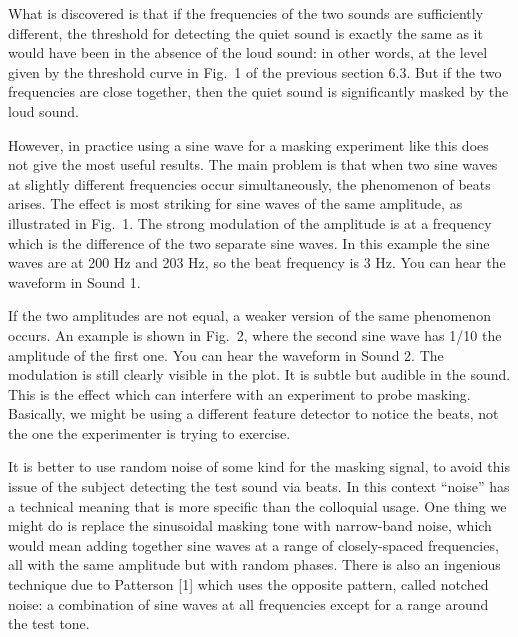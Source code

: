  What is discovered is that if the frequencies of the two sounds are 
  sufficiently different, the threshold for detecting the quiet sound is 
  exactly the same as it would have been in the absence of the loud sound: in 
  other words, at the level given by the threshold curve in Fig.\ 1 of the 
  previous section 6.3. But if the two frequencies are close together, then the 
  quiet sound is significantly masked by the loud sound. 

  However, in practice using a sine wave for a masking experiment like this 
  does not give the most useful results. The main problem is that when two sine 
  waves at slightly different frequencies occur simultaneously, the phenomenon 
  of beats arises. The effect is most striking for sine waves of the same 
  amplitude, as illustrated in Fig.\ 1. The strong modulation of the amplitude 
  is at a frequency which is the difference of the two separate sine waves. In 
  this example the sine waves are at 200 Hz and 203 Hz, so the beat frequency 
  is 3 Hz. You can hear the waveform in Sound 1. 

  If the two amplitudes are not equal, a weaker version of the same phenomenon 
  occurs. An example is shown in Fig.\ 2, where the second sine wave has 1/10 
  the amplitude of the first one. You can hear the waveform in Sound 2. The 
  modulation is still clearly visible in the plot. It is subtle but audible in 
  the sound. This is the effect which can interfere with an experiment to probe 
  masking. Basically, we might be using a different feature detector to notice 
  the beats, not the one the experimenter is trying to exercise. 

  It is better to use random noise of some kind for the masking signal, to 
  avoid this issue of the subject detecting the test sound via beats. In this 
  context ``noise'' has a technical meaning that is more specific than the 
  colloquial usage. One thing we might do is replace the sinusoidal masking 
  tone with narrow-band noise, which would mean adding together sine waves at a 
  range of closely-spaced frequencies, all with the same amplitude but with 
  random phases. There is also an ingenious technique due to Patterson [1] 
  which uses the opposite pattern, called notched noise: a combination of sine 
  waves at all frequencies except for a range around the test tone. 

